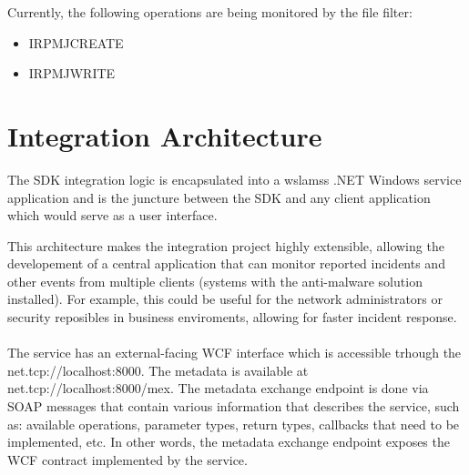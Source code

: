         Currently, the following operations are being monitored by the file filter:

        \begin{itemize}
            \item IRP\textunderscore MJ\textunderscore CREATE
            \item IRP\textunderscore MJ\textunderscore WRITE
        \end{itemize}
        
    \section{Integration Architecture}
    The SDK integration logic is encapsulated into a wslamss .NET Windows service application and is the juncture between the SDK and any 
    client application which would serve as a user interface.

    This architecture makes the integration project highly extensible, allowing the developement of a central application that can monitor
    reported incidents and other events from multiple clients (systems with the anti-malware solution installed). For example, this could be
    useful for the network administrators or security reposibles in business enviroments, allowing for faster incident response.
    
    \paragraph{}
    The service has an external-facing WCF interface which is accessible trhough the net.tcp://localhost:8000. The metadata is available at
    net.tcp://localhost:8000/mex. The metadata exchange endpoint is done via SOAP messages that contain various information that describes
    the service, such as: available operations, parameter types, return types, callbacks that need to be implemented, etc. In other words,
    the metadata exchange endpoint exposes the WCF contract implemented by the service.

    


        